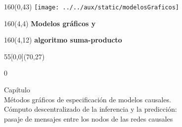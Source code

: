 \documentclass[shownotes,aspectratio=169]{beamer}
\newcounter{capitulo}
\newcommand{\unidad}{\thecapitulo \stepcounter{capitulo}}
\begin{document}
\begin{frame}
\begin{textblock}{160}(0,43)
\texttt{[image: ../../aux/static/modelosGraficos]}
\end{textblock}


\begin{textblock}{160}(4,4)
\LARGE \textcolor{black!85}{\fontsize{22}{0}\selectfont \textbf{Modelos gráficos y}}
\end{textblock}
\begin{textblock}{160}(4,12)
\LARGE \textcolor{black!85}{\fontsize{22}{0}\selectfont \textbf{algoritmo suma-producto}}
\end{textblock}


\begin{textblock}{55}[0,0](70,27)
\begin{turn}{0}
\parbox{10cm}{\sloppy\setlength\parfillskip{0pt}
\textcolor{black!85}{Capítulo \unidad} \\
\small\textcolor{black!85}{Métodos gráficos de especificación de modelos causales.} \\
\small\textcolor{black!85}{Cómputo descentralizado de la inferencia y la predicción:} \\
\small\textcolor{black!85}{pasaje de mensajes entre los nodos de las redes causales}\\
}
\end{turn}
\end{textblock}

\end{frame}
\end{document}
